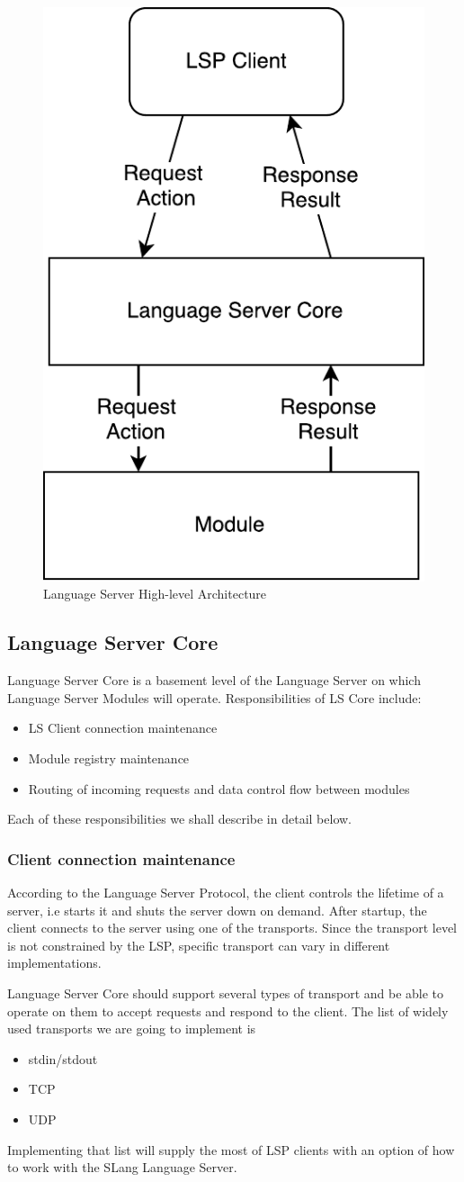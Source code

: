 \begin{figure}[H]
    \centering
    \includegraphics[width=.3\textwidth]{figs/highlevel_architecture.pdf}
    \caption{Language Server High-level Architecture}
    \label{fig:met:ls_highlevel_arch}
\end{figure}

\subsection{Language Server Core}
\label{sec:met:arch:core}
Language Server Core is a basement level of the Language Server on which Language Server Modules will operate.
Responsibilities of LS Core include:
\begin{itemize}
    \item LS Client connection maintenance
    \item Module registry maintenance
    \item Routing of incoming requests and data control flow between modules
\end{itemize}

Each of these responsibilities we shall describe in detail below.

\subsubsection{Client connection maintenance}
\label{sec:met:arch:core:connection_maintenance}
According to the Language Server Protocol\cite{Sourcegraph}, the client controls the lifetime of a server,
i.e starts it and shuts the server down on demand. After startup, the client connects to the server
using one of the transports. Since the transport level is not constrained by the LSP, specific transport can vary in different implementations.

Language Server Core should support several types of transport and be able to operate on them to accept requests and respond to the client. The list of widely used transports we are going to implement is
\begin{itemize}
    \item stdin/stdout
    \item TCP
    \item UDP
\end{itemize}
Implementing that list will supply the most of LSP clients with an option of how to work with the SLang Language Server.

